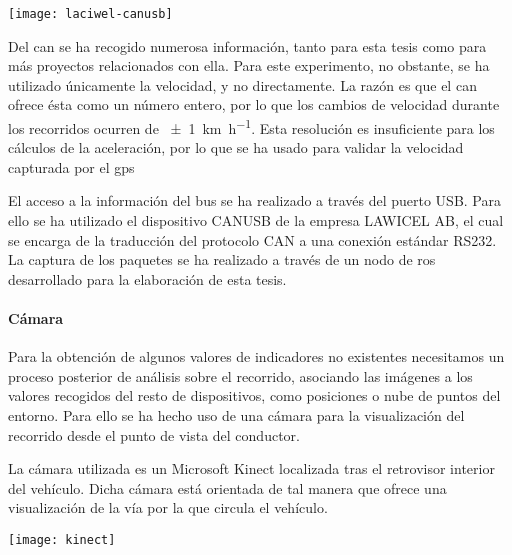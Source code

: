 \begin{marginfigure}
	\centering
	\texttt{[image: laciwel-canusb]}
	\caption[Dispositivo \acrshort{can} BUS de LACIWEL AB]{El dispositivo CANBUS de LACIWEL AB permite el acceso a través del protocolo RS 232 por el puerto USB al bus \ac{can}. Fuente: \url{http://www.can232.com/}.}
	\label{fig:laciwel-canusb}
\end{marginfigure}

Del \Acrshort{can} se ha recogido numerosa información, tanto para esta tesis como para más proyectos relacionados con ella. Para este experimento, no obstante, se ha utilizado únicamente la velocidad, y no directamente. La razón es que el \Acrshort{can} ofrece ésta como un número entero, por lo que los cambios de velocidad durante los recorridos ocurren de \SI{\pm1}{\km\per\hour}. Esta resolución es insuficiente para los cálculos de la aceleración, por lo que se ha usado para validar la velocidad capturada por el \Acrshort{gps}

El acceso a la información del bus se ha realizado a través del puerto USB. Para ello se ha utilizado el dispositivo CANUSB de la empresa LAWICEL AB, el cual se encarga de la traducción del protocolo CAN a una conexión estándar RS232. La captura de los paquetes se ha realizado a través de un nodo de \ac{ros} desarrollado para la elaboración de esta tesis.

\paragraph{Cámara}

Para la obtención de algunos valores de indicadores no existentes necesitamos un proceso posterior de análisis sobre el recorrido, asociando las imágenes a los valores recogidos del resto de dispositivos, como posiciones o nube de puntos del entorno. Para ello se ha hecho uso de una cámara para la visualización del recorrido desde el punto de vista del conductor.

La cámara utilizada es un Microsoft Kinect localizada tras el retrovisor interior del vehículo. Dicha cámara está orientada de tal manera que ofrece una visualización de la vía por la que circula el vehículo.

\begin{marginfigure}
	\centering
	\texttt{[image: kinect]}
	\caption[Cámara Microsoft Kinect]{La cámara Kinect desarrollada por Microsoft ofrece imágenes a color a una velocidad de \SI{30}{\fps} con una resolución de \SI{640x480}{\px}.}
	\label{fig:kinect}
\end{marginfigure}

